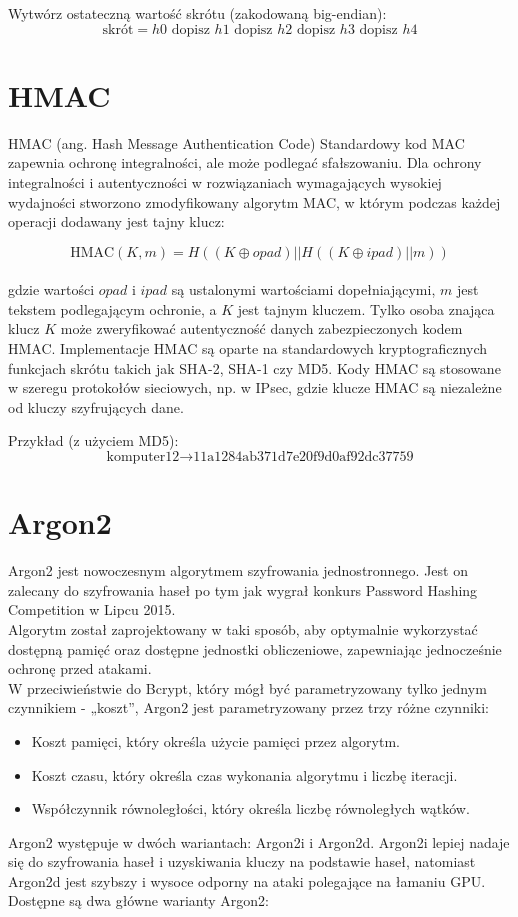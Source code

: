 \documentclass[12pt, letterpaper]{article}
\begin{document}
Wytwórz ostateczną wartość skrótu (zakodowaną big-endian):
\[ \text{skrót} = h0 \text{ dopisz } h1 \text{ dopisz } h2 \text{ dopisz } h3 \text{ dopisz } h4 \]
\newpage
\section{HMAC}
HMAC (ang. Hash Message Authentication Code) Standardowy kod MAC zapewnia ochronę integralności, ale może podlegać sfałszowaniu. Dla ochrony integralności i autentyczności w rozwiązaniach wymagających wysokiej wydajności stworzono zmodyfikowany algorytm MAC, w którym podczas każdej operacji dodawany jest tajny klucz:

\[ \text{HMAC}(K, m) = H((K \oplus opad) || H((K \oplus ipad) || m)) \]
\\
gdzie wartości \(opad\) i \(ipad\) są ustalonymi wartościami dopełniającymi, \(m\) jest tekstem podlegającym ochronie, a \(K\) jest tajnym kluczem. Tylko osoba znająca klucz \(K\) może zweryfikować autentyczność danych zabezpieczonych kodem HMAC. Implementacje HMAC są oparte na standardowych kryptograficznych funkcjach skrótu takich jak SHA-2, SHA-1 czy MD5. Kody HMAC są stosowane w szeregu protokołów sieciowych, np. w IPsec, gdzie klucze HMAC są niezależne od kluczy szyfrujących dane.

Przykład (z użyciem MD5):
\[ \text{komputer12} \rightarrow \text{11a1284ab371d7e20f9d0af92dc37759} \]
\newpage
\section{Argon2}
Argon2 jest nowoczesnym algorytmem szyfrowania jednostronnego. Jest on zalecany do szyfrowania haseł po tym jak wygrał konkurs Password Hashing Competition w Lipcu 2015.
\\
Algorytm został zaprojektowany w taki sposób, aby optymalnie wykorzystać dostępną pamięć oraz dostępne jednostki obliczeniowe, zapewniając jednocześnie ochronę przed atakami.
\\
W przeciwieństwie do Bcrypt, który mógł być parametryzowany tylko jednym czynnikiem - „koszt”, Argon2 jest parametryzowany przez trzy różne czynniki:
\begin{itemize}
    \item Koszt pamięci, który określa użycie pamięci przez algorytm.
    \item Koszt czasu, który określa czas wykonania algorytmu i liczbę iteracji.
    \item Współczynnik równoległości, który określa liczbę równoległych wątków.
\end{itemize}
Argon2 występuje w dwóch wariantach: Argon2i i Argon2d. Argon2i lepiej nadaje się do szyfrowania haseł i uzyskiwania kluczy na podstawie haseł, natomiast Argon2d jest szybszy i wysoce odporny na ataki polegające na łamaniu GPU.
\\
Dostępne są dwa główne warianty Argon2:
\end{document}
